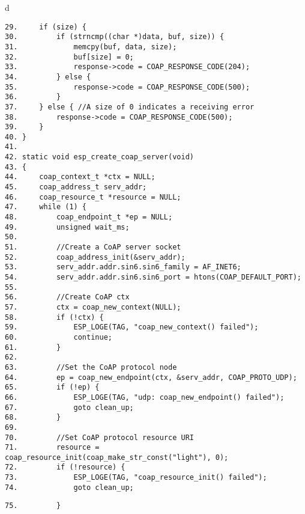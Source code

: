 \documentclass[a4paper,12pt]{book}
\begin{document}
\begin{codebloc}
\begin{tabular}{d}
\vspace{2pt}
\begin{verbatim}
29.     if (size) {
30.         if (strncmp((char *)data, buf, size)) {
31.             memcpy(buf, data, size);
32.             buf[size] = 0;
33.             response->code = COAP_RESPONSE_CODE(204);
34.         } else {
35.             response->code = COAP_RESPONSE_CODE(500);
36.         }
37.     } else { //A size of 0 indicates a receiving error
38.         response->code = COAP_RESPONSE_CODE(500);
39.     }
40. }
41.	
42. static void esp_create_coap_server(void)
43. {
44.     coap_context_t *ctx = NULL;
45.     coap_address_t serv_addr;
46.     coap_resource_t *resource = NULL;
47.     while (1) {
48.         coap_endpoint_t *ep = NULL;
49.         unsigned wait_ms;
50.	
51.         //Create a CoAP server socket
52.         coap_address_init(&serv_addr);
53.         serv_addr.addr.sin6.sin6_family = AF_INET6;
54.         serv_addr.addr.sin6.sin6_port = htons(COAP_DEFAULT_PORT);
55.	
56.         //Create CoAP ctx
57.         ctx = coap_new_context(NULL);
58.         if (!ctx) {
59.             ESP_LOGE(TAG, "coap_new_context() failed");
60.             continue;
61.         }
62.	
63.         //Set the CoAP protocol node
64.         ep = coap_new_endpoint(ctx, &serv_addr, COAP_PROTO_UDP);
65.         if (!ep) {
66.             ESP_LOGE(TAG, "udp: coap_new_endpoint() failed");
67.             goto clean_up;
68.         }
69.	
70.         //Set CoAP protocol resource URI
71.         resource = coap_resource_init(coap_make_str_const("light"), 0);
72.         if (!resource) {
73.             ESP_LOGE(TAG, "coap_resource_init() failed");
74.             goto clean_up;
\end{verbatim}
\verb|75.         }|
\end{tabular}
\end{codebloc}
\end{document}
